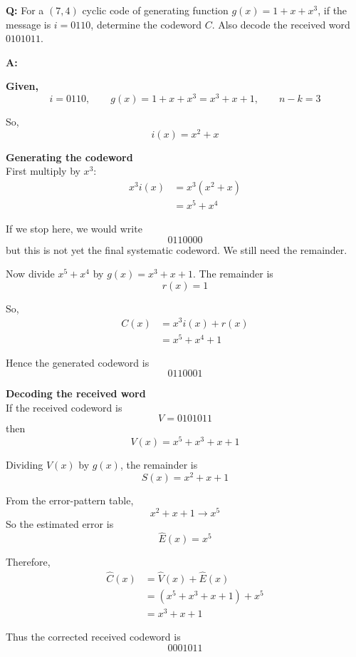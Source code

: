 \documentclass[11pt,a4paper]{book}
\newcounter{qna}[chapter]
\renewcommand{\theqna}{\thechapter.\arabic{qna}}
\newenvironment{questionanswerbox}[1][Example]{%
    \refstepcounter{qna}
    \begin{tcolorbox}[
        enhanced,
        breakable,
        colback=softlavender!10,
        colframe=softlavender!200,
        title={#1~\theqna},
        fonttitle=\bfseries,
        coltitle=white,
        colbacktitle=softlavender!200,
        sharp corners,
        boxrule=1pt,
        left=8pt,
        right=8pt,
        top=6pt,
        bottom=6pt
    ]
}{\end{tcolorbox}}
\begin{document}
\begin{questionanswerbox}[Cyclic Encoding and Decoding Example]
\textbf{Q:} For a \((7,4)\) cyclic code of generating function \(g(x)=1+x+x^3\), if the message is \(i=0110\), determine the codeword \(C\). Also decode the received word \(0101011\).

\textbf{A:}

\textbf{Given,}
\[
i=0110,\qquad g(x)=1+x+x^3=x^3+x+1,\qquad n-k=3
\]

So,
\[
i(x)=x^2+x
\]

\textbf{Generating the codeword}\\
First multiply by \(x^3\):
\begin{align*}
x^3 i(x)&=x^3(x^2+x)\\
        &=x^5+x^4
\end{align*}

If we stop here, we would write
\[
0110000
\]
but this is not yet the final systematic codeword. We still need the remainder.

Now divide \(x^5+x^4\) by \(g(x)=x^3+x+1\). The remainder is
\[
r(x)=1
\]

So,
\begin{align*}
C(x)&=x^3i(x)+r(x)\\
    &=x^5+x^4+1
\end{align*}

Hence the generated codeword is
\[
0110001
\]

\textbf{Decoding the received word}\\
If the received codeword is
\[
V=0101011
\]
then
\[
V(x)=x^5+x^3+x+1
\]

Dividing \(V(x)\) by \(g(x)\), the remainder is
\[
S(x)=x^2+x+1
\]

From the error-pattern table,
\[
x^2+x+1 \longrightarrow x^5
\]
So the estimated error is
\[
\hat E(x)=x^5
\]

Therefore,
\begin{align*}
\hat C(x)&=\hat V(x)+\hat E(x)\\
         &=(x^5+x^3+x+1)+x^5\\
         &=x^3+x+1
\end{align*}

Thus the corrected received codeword is
\[
0001011
\]
\end{questionanswerbox}
\end{document}

